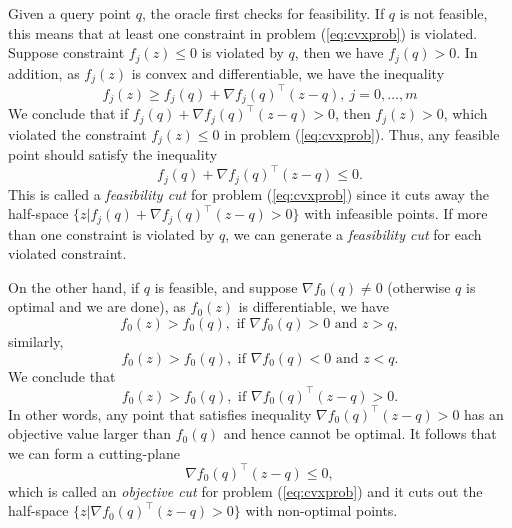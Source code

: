 \documentclass[9pt]{extarticle}
\begin{document}
Given a query point $q$, the oracle first checks for feasibility.
If $q$ is not feasible, this means that at least one constraint in problem (\ref{eq:cvxprob}) is violated.
Suppose constraint $f_j(z) \le 0$ is violated by $q$, then we have $f_j(q) > 0$.
In addition, as $f_j(z)$ is convex and differentiable, we have the inequality
\begin{equation}
\label{eq:funprop}
f_j(z) \ge f_j(q) + \nabla f_j(q)^\top (z - q),~ j = 0, \dots, m
\end{equation}
We conclude that if $f_j(q) + \nabla f_j(q)^\top (z - q) > 0$, then $f_j(z) > 0$, 
which violated the constraint $f_j(z) \le 0$ in problem (\ref{eq:cvxprob}).
Thus, any feasible point should satisfy the inequality
\begin{equation}
\label{eq:feacut}
f_j(q) + \nabla f_j(q)^\top (z - q) \le 0.
\end{equation}
This is called a \textit{feasibility cut} for problem (\ref{eq:cvxprob}) since it cuts away the half-space 
$\{z | f_j(q) + \nabla f_j(q)^\top (z - q) > 0 \}$ with infeasible points.
If more than one constraint is violated by $q$, we can generate a \emph{feasibility cut} for each violated constraint.

On the other hand, if $q$ is feasible, and suppose $\nabla f_0(q) \ne 0$ (otherwise $q$ is optimal and we are done),
as $f_0(z)$ is differentiable, we have
\begin{equation*}
f_0(z) > f_0(q), \text{~if~} \nabla f_0(q) > 0 \text{~and~} z > q,
\end{equation*}
similarly,
\begin{equation*}
f_0(z) > f_0(q), \text{~if~} \nabla f_0(q) < 0 \text{~and~} z < q.
\end{equation*}
We conclude that
\begin{equation*}
f_0(z) > f_0(q), \text{~if~} \nabla f_0(q)^\top (z - q) > 0.
\end{equation*}
In other words, any point that satisfies inequality $\nabla f_0(q)^\top (z - q) > 0$ has an objective value larger than $f_0(q)$ 
and hence cannot be optimal.
It follows that we can form a cutting-plane
\begin{equation}
\label{eq:objcut}
\nabla f_0(q)^\top (z - q) \le 0,
\end{equation}
which is called an \textit{objective cut} for problem (\ref{eq:cvxprob}) and 
it cuts out the half-space $\{z | \nabla f_0(q)^\top (z - q) > 0 \}$ with non-optimal points.
\end{document}
